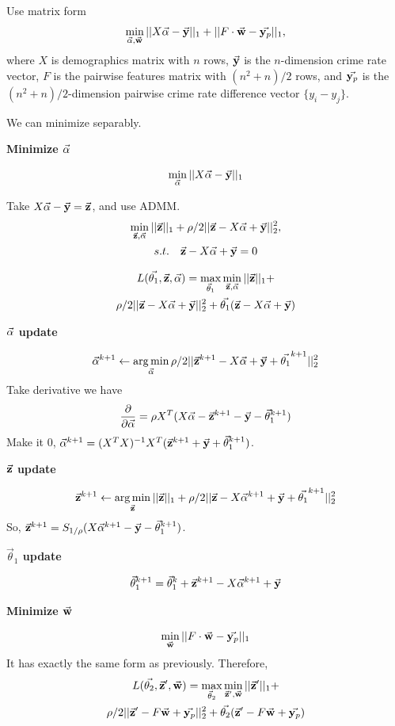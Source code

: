 Use matrix form
\[
\min_{\demow, \w} ||X \demow - \y||_1 + ||F \cdot \w - \yp||_1,
\]
where $X$ is demographics matrix with $n$ rows, $\y$ is the $n$-dimension crime rate vector, $F$ is the pairwise features matrix with $(n^2+n)/2$  rows, and $\yp$ is the $(n^2+n)/2$-dimension pairwise crime rate difference vector $\{y_i- y_j\}$.

We can minimize separably.



\textbf{Minimize $\demow$}

\[ \min_{\demow} ||X \demow - \y||_1 \]

Take $X\demow - \y = \z$, and use ADMM.
\begin{multline}
 \min_{\z, \demow}  ||\z||_1 + \rho/2 ||\z - X\demow + \y||_2^2,\\
   s.t.\quad  \z - X\demow + \y = 0 
\end{multline}

\begin{multline}
L(\vec{\theta_1}, \z, \demow) = \max_{\vec\theta_1} \min_{\z, \demow} ||\z||_1 + \\
\rho/2 ||\z - X\demow + \y||_2^2  + \vec{\theta_1}( \z - X\demow + \y ) 
\end{multline}

\textbf{$\demow$ update}

\[ \demow^{k+1} \gets \argmin_{\demow}  \rho/2 ||\z^{k+1} - X\demow + \y + \vec{\theta_1}^{k+1}||_2^2 \]
Take derivative we have
\[ \frac{\partial}{\partial \demow} = \rho X^T(X\demow - \z^{k+1} - \y - \vec\theta_1^{k+1} ) \]
Make it $0$, $\demow^{k+1} = (X^TX)^{-1} X^T(\z^{k+1} + \y + \vec\theta_1^{k+1})$.

\textbf{$\z$ update}

\[ \z^{k+1} \gets \argmin_{\z}  ||\z||_1 + \rho/2 ||\z - X\demow^{k+1} + \y + \vec{\theta_1}^{k+1}||_2^2 \]
So, $\z^{k+1} = S_{1/\rho}(X\demow^{k+1} - \y - \vec\theta_1^{k+1})$.

\textbf{$\vec\theta_1$ update}

\[ \vec\theta_1^{k+1} = \vec\theta_1^{k} + \z^{k+1} - X\demow^{k+1} + \y \]



\textbf{Minimize $\w$}

\[ \min_{\w} ||F \cdot \w - \yp||_1 \]
It has exactly the same form as previously. Therefore,
\begin{multline}
L(\vec{\theta_2}, \z', \w) = \max_{\vec\theta_2} \min_{\z', \w}  ||\z'||_1 + \\
\rho/2 ||\z' - F\w + \yp||_2^2 + \vec{\theta_2}( \z' - F\w + \yp ) 
\end{multline}

